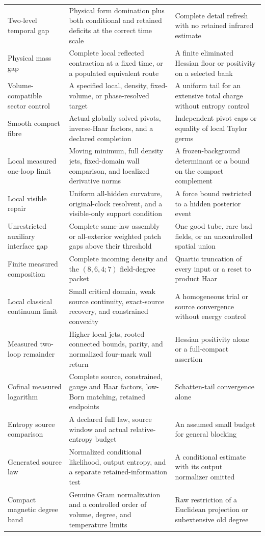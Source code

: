\documentclass[11pt,oneside,openany]{book}
\theoremstyle{definition}
\theoremstyle{remark}
\begin{document}
\begin{longtable}{L{0.27\textwidth}L{0.34\textwidth}L{0.29\textwidth}}
Two-level temporal gap & Physical form domination plus both conditional and retained deficits at the correct time scale & Complete detail refresh with no retained infrared estimate \\
Physical mass gap & Complete local reflected contraction at a fixed time, or a populated equivalent route & A finite eliminated Hessian floor or positivity on a selected bank \\
Volume-compatible sector control & A specified local, density, fixed-volume, or phase-resolved target & A uniform tail for an extensive total charge without entropy control \\
Smooth compact fibre & Actual globally solved pivots, inverse-Haar factors, and a declared completion & Independent pivot caps or equality of local Taylor germs \\
Local measured one-loop limit & Moving minimum, full density jets, fixed-domain wall comparison, and localized derivative norms & A frozen-background determinant or a bound on the compact complement \\
Local visible repair & Uniform all-hidden curvature, original-clock resolvent, and a visible-only support condition & A force bound restricted to a hidden posterior event \\
Unrestricted auxiliary interface gap & Complete same-law assembly or all-exterior weighted patch gaps above their threshold & One good tube, rare bad fields, or an uncontrolled spatial union \\

Finite measured composition & Complete incoming density and the $(8,6,4;7)$ field-degree packet & Quartic truncation of every input or a reset to product Haar \\
Local classical continuum limit & Small critical domain, weak source continuity, exact-source recovery, and constrained convexity & A homogeneous trial or source convergence without energy control \\

Measured two-loop remainder & Higher local jets, rooted connected bounds, parity, and normalized four-mark wall return & Hessian positivity alone or a full-compact assertion \\
Cofinal measured logarithm & Complete source, constrained, gauge and Haar factors, low-Born matching, retained endpoints & Schatten-tail convergence alone \\
Entropy source comparison & A declared full law, source window and actual relative-entropy budget & An assumed small budget for general blocking \\
Generated source law & Normalized conditional likelihood, output entropy, and a separate retained-information test & A conditional estimate with its output normalizer omitted \\
Compact magnetic degree band & Genuine Gram normalization and a controlled order of volume, degree, and temperature limits & Raw restriction of a Euclidean projection or subextensive old degree \\


\end{longtable}
\end{document}
